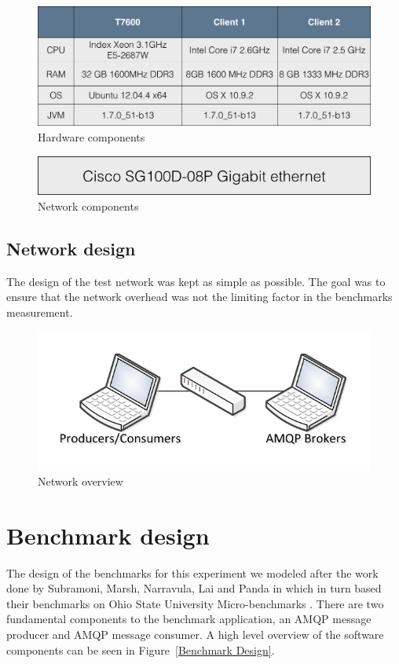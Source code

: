 \documentclass{thesis}
\begin{document}
\begin{figure}[h]
\centering
\label{hardware_components}
\includegraphics[scale=.40]{hardware_components}  
\caption{Hardware components}
\end{figure}

\begin{figure}[h]
\centering
\label{network_components}
\includegraphics[scale=.40]{network_hardware}  
\caption{Network components}
\end{figure}

\subsection{Network design}
The design of the test network was kept as simple as possible.  The goal was to ensure that the network overhead was not the limiting factor in the benchmarks measurement.

\begin{figure}[h]
\centering
\includegraphics{test_setup}  
\caption{Network overview}
\end{figure}

\section{Benchmark design}
The design of the benchmarks for this experiment we modeled after the work done by Subramoni, Marsh, Narravula, Lai and Panda in \cite{Subramoni} which in turn based their benchmarks on Ohio State University Micro-benchmarks \cite{OSU_MICRO_BENCHMARKS}.  There are two fundamental components to the benchmark application, an AMQP message producer and AMQP message consumer.  A high level overview of the software components can be seen in Figure~\ref{Benchmark Design}.  
\end{document}
